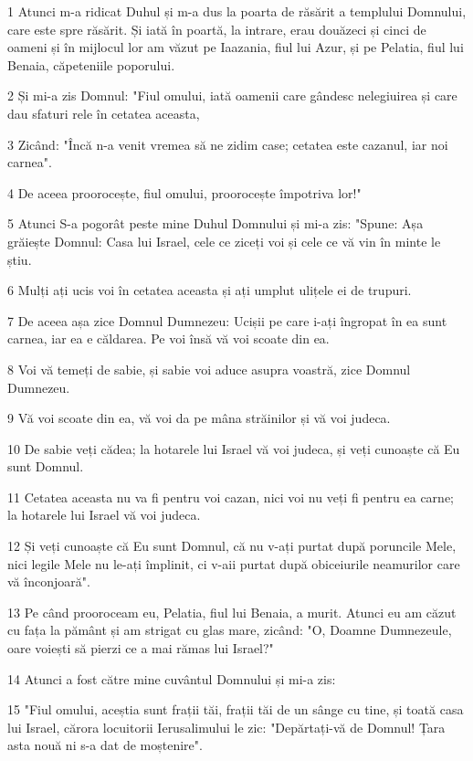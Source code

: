 \par 1 Atunci m-a ridicat Duhul și m-a dus la poarta de răsărit a templului Domnului, care este spre răsărit. Și iată în poartă, la intrare, erau douăzeci și cinci de oameni și în mijlocul lor am văzut pe Iaazania, fiul lui Azur, și pe Pelatia, fiul lui Benaia, căpeteniile poporului.
\par 2 Și mi-a zis Domnul: "Fiul omului, iată oamenii care gândesc nelegiuirea și care dau sfaturi rele în cetatea aceasta,
\par 3 Zicând: "Încă n-a venit vremea să ne zidim case; cetatea este cazanul, iar noi carnea".
\par 4 De aceea proorocește, fiul omului, proorocește împotriva lor!"
\par 5 Atunci S-a pogorât peste mine Duhul Domnului și mi-a zis: "Spune: Așa grăiește Domnul: Casa lui Israel, cele ce ziceți voi și cele ce vă vin în minte le știu.
\par 6 Mulți ați ucis voi în cetatea aceasta și ați umplut ulițele ei de trupuri.
\par 7 De aceea așa zice Domnul Dumnezeu: Ucișii pe care i-ați îngropat în ea sunt carnea, iar ea e căldarea. Pe voi însă vă voi scoate din ea.
\par 8 Voi vă temeți de sabie, și sabie voi aduce asupra voastră, zice Domnul Dumnezeu.
\par 9 Vă voi scoate din ea, vă voi da pe mâna străinilor și vă voi judeca.
\par 10 De sabie veți cădea; la hotarele lui Israel vă voi judeca, și veți cunoaște că Eu sunt Domnul.
\par 11 Cetatea aceasta nu va fi pentru voi cazan, nici voi nu veți fi pentru ea carne; la hotarele lui Israel vă voi judeca.
\par 12 Și veți cunoaște că Eu sunt Domnul, că nu v-ați purtat după poruncile Mele, nici legile Mele nu le-ați împlinit, ci v-aii purtat după obiceiurile neamurilor care vă înconjoară".
\par 13 Pe când prooroceam eu, Pelatia, fiul lui Benaia, a murit. Atunci eu am căzut cu fața la pământ și am strigat cu glas mare, zicând: "O, Doamne Dumnezeule, oare voiești să pierzi ce a mai rămas lui Israel?"
\par 14 Atunci a fost către mine cuvântul Domnului și mi-a zis:
\par 15 "Fiul omului, aceștia sunt frații tăi, frații tăi de un sânge cu tine, și toată casa lui Israel, cărora locuitorii Ierusalimului le zic: "Depărtați-vă de Domnul! Țara asta nouă ni s-a dat de moștenire".
